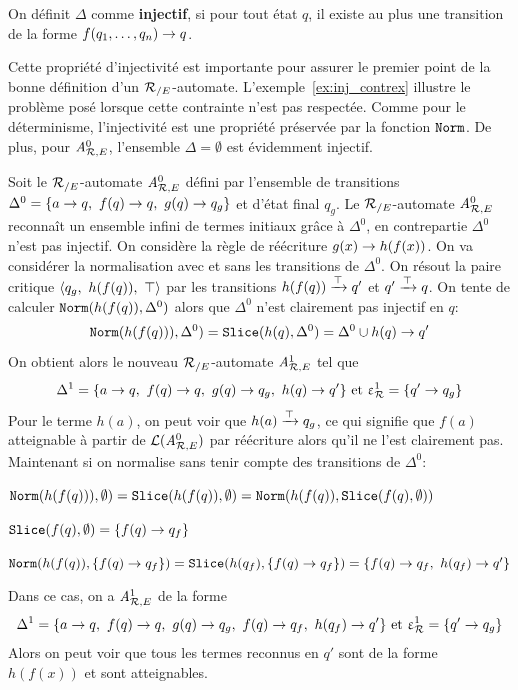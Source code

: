 \begin{definition}
  On définit $\Delta$ comme \textbf{injectif}, si pour tout état $q$,
  il existe au plus une transition de la forme $f(q_1, \dots, q_n) \rightarrow q$.
\end{definition}
Cette propriété d'injectivité est importante pour assurer le premier point de la bonne définition
d'un ${\mathcal R_{/E}}$-automate. L'exemple~\ref{ex:inj_contrex} illustre le problème posé
lorsque cette contrainte n'est pas respectée. Comme pour le déterminisme, l'injectivité
est une propriété préservée par la fonction $\mathtt{Norm}$. De plus, pour ${\mathit A}_{\mathcal R,E}^0$, l'ensemble $\Delta = \emptyset$
est évidemment injectif.

\begin{example}
  \label{ex:inj_contrex}
  Soit le ${\mathcal R_{/E}}$-automate ${\mathit A}_{\mathcal R,E}^0$ défini par l'ensemble de transitions
  $\Delta^0 = \{ a \rightarrow q,\ f(q)\rightarrow q,\ g(q) \rightarrow q_g\}$ et d'état final $q_g$.
  Le ${\mathcal R_{/E}}$-automate ${\mathit A}_{\mathcal R,E}^0$ reconnaît un ensemble infini de termes initiaux grâce à $\Delta^0$,
  en contrepartie $\Delta^0$ n'est pas injectif.
  On considère la règle de réécriture $g(x) \rightarrow h(f(x))$. On va considérer la normalisation 
  avec et sans les transitions de $\Delta^0$. On résout la paire critique $\la q_g,\ h(f(q)),\ \top\ra$ 
  par les transitions $h(f(q)) \xrightarrow{\top} q'$ et $q'\xrightarrow{\top} q$. On tente de calculer $\mathtt{Norm}(h(f(q)),\Delta^0)$ 
  alors que $\Delta^0$ n'est clairement pas injectif en $q$:
  \[\mathtt{Norm}(h(f(q))),\Delta^0) = \mathtt{Slice}(h(q),\Delta^0) = \Delta^0 \cup h(q) \rightarrow q'\]
  On obtient alors le nouveau ${\mathcal R_{/E}}$-automate ${\mathit A}_{\mathcal R,E}^1$ tel que 
  \[\Delta^1 = \{a \rw q,\ f(q)\rw q,\ g(q) \rw q_g,\ h(q) \rw q'\}\textrm{ et } \Drw^1= \{ q' \rw q_g\}\]
  Pour le terme $h(a)$, on peut voir que $h(a) \xrightarrow{\top} q_g$, ce qui signifie que $f(a)$ atteignable à partir de
  $\mathcal{L}({\mathit A}_{\mathcal R,E}^0)$ par réécriture alors qu'il ne l'est clairement pas. Maintenant si on normalise sans tenir
  compte des transitions de $\Delta^0$:
  \begin{description}
  \item $\mathtt{Norm}(h(f(q))),\emptyset) = \mathtt{Slice}(h(f(q)),\emptyset) = \mathtt{Norm}(h(f(q)), \mathtt{Slice}(f(q),\emptyset))$
  \item $\mathtt{Slice}(f(q),\emptyset) = \{f(q) \rightarrow q_f\}$
  \item $\mathtt{Norm}(h(f(q)), \{f(q) \rightarrow q_f\}) = \mathtt{Slice}(h(q_f), \{f(q) \rightarrow q_f\}) = \{f(q) \rightarrow q_f,\ h(q_f) \rightarrow q'\}$
  \end{description}
  Dans ce cas, on a ${\mathit A}_{\mathcal R,E}^1$ de la forme 
  \[\Delta^1 = \{a \rw q,\ f(q)\rw q,\ g(q) \rw q_g,\ f(q) \rw q_f,\ h(q_f) \rw q'\}
  \textrm{ et } \Drw^1= \{ q' \rw q_g\}\]
  Alors on peut voir que tous les termes reconnus en $q'$ sont de la forme $h(f(x))$ et sont atteignables.
\end{example}

